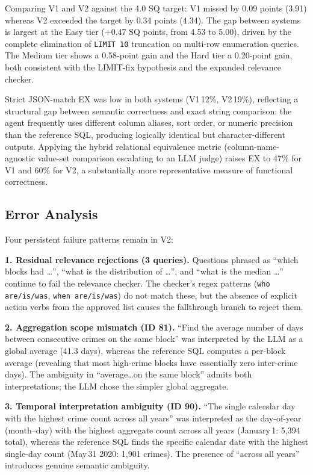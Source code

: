 Comparing V1 and V2 against the 4.0 SQ target: V1 missed by 0.09 points (3.91)
whereas V2 exceeded the target by 0.34 points (4.34). The gap between systems
is largest at the Easy tier (+0.47 SQ points, from 4.53 to 5.00), driven by the
complete elimination of \texttt{LIMIT 10} truncation on multi-row enumeration
queries. The Medium tier shows a 0.58-point gain and the Hard tier a 0.20-point
gain, both consistent with the LIMIT-fix hypothesis and the expanded relevance
checker.

Strict JSON-match EX was low in both systems (V1\,12\%, V2\,19\%), reflecting
a structural gap between semantic correctness and exact string comparison: the
agent frequently uses different column aliases, sort order, or numeric precision
than the reference SQL, producing logically identical but character-different
outputs. Applying the hybrid relational equivalence metric (column-name-agnostic
value-set comparison escalating to an LLM judge) raises EX to 47\% for V1 and
60\% for V2, a substantially more representative measure of functional
correctness.

\subsection{Error Analysis}

Four persistent failure patterns remain in V2:

\textbf{1. Residual relevance rejections (3 queries).}
Questions phrased as ``which blocks had \ldots'', ``what is the distribution
of \ldots'', and ``what is the median \ldots'' continue to fail the relevance
checker. The checker's regex patterns (\texttt{who are/is/was}, \texttt{when
are/is/was}) do not match these, but the absence of explicit action verbs from
the approved list causes the fallthrough branch to reject them.

\textbf{2. Aggregation scope mismatch (ID 81).}
``Find the average number of days between consecutive crimes on the same block''
was interpreted by the LLM as a global average (41.3 days), whereas the reference
SQL computes a per-block average (revealing that most high-crime blocks have
essentially zero inter-crime days). The ambiguity in ``average\ldots on the same
block'' admits both interpretations; the LLM chose the simpler global aggregate.

\textbf{3. Temporal interpretation ambiguity (ID 90).}
``The single calendar day with the highest crime count across all years'' was
interpreted as the day-of-year (month–day) with the highest aggregate count
across all years (January\,1: 5,394 total), whereas the reference SQL finds the
specific calendar date with the highest single-day count (May\,31 2020: 1,901
crimes). The presence of ``across all years'' introduces genuine semantic
ambiguity.

